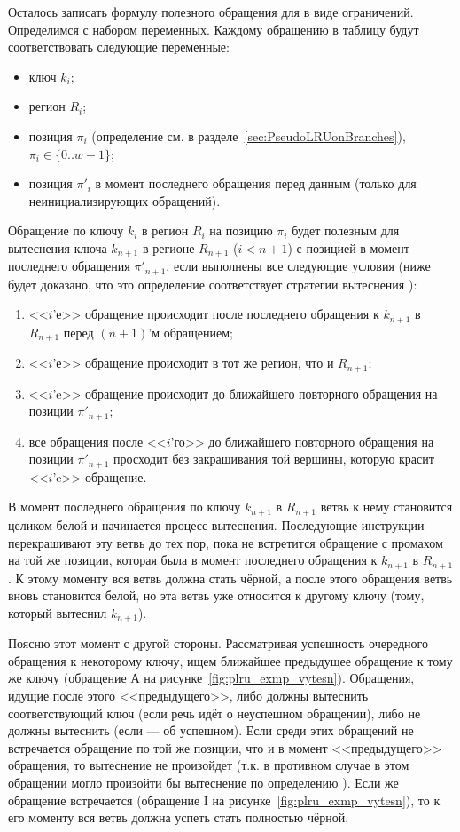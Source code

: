 Осталось записать формулу полезного обращения для \PseudoLRU в виде ограничений. Определимся с набором переменных. Каждому обращению в таблицу будут соответствовать следующие переменные:
\begin{itemize}
  \item ключ $k_i$;
  \item регион $R_i$;
  \item позиция $\pi_i$ (определение см. в разделе~\ref{sec:PseudoLRUonBranches}), $\pi_i \in \{0..w{-}1\}$;
  \item позиция $\pi'_i$ в момент последнего обращения перед данным (только для неинициализирующих обращений).
\end{itemize}

Обращение по ключу $k_i$ в регион $R_i$ на позицию $\pi_i$ будет полезным для вытеснения ключа $k_{n+1}$ в регионе $R_{n+1}$ ($i < n+1$) с позицией в момент последнего обращения $\pi'_{n+1}$, если выполнены все следующие условия (ниже будет доказано, что это определение соответствует стратегии вытеснения \PseudoLRU):
\begin{enumerate}
  \item <<$i$'е>> обращение происходит после последнего обращения к $k_{n+1}$ в $R_{n+1}$ перед $(n+1)$'м обращением;
  \item <<$i$'е>> обращение происходит в тот же регион, что и $R_{n+1}$;
  \item <<$i$'e>> обращение происходит до ближайшего повторного обращения на позиции $\pi'_{n+1}$;
  \item все обращения после <<$i$'го>> до ближайшего повторного обращения на позиции $\pi'_{n+1}$ просходит без закрашивания той вершины, которую красит <<$i$'e>> обращение.
\end{enumerate}

В момент последнего обращения по ключу $k_{n+1}$ в $R_{n+1}$ ветвь к нему становится целиком белой и начинается процесс вытеснения. Последующие инструкции перекрашивают эту ветвь до тех пор, пока не встретится обращение с промахом на той же позиции, которая была в момент последнего обращения к $k_{n+1}$ в $R_{n+1}$. К этому моменту вся ветвь должна стать чёрной, а после этого обращения ветвь вновь становится белой, но эта ветвь уже относится к другому ключу (тому, который вытеснил $k_{n+1}$).

Поясню этот момент с другой стороны. Рассматривая успешность очередного обращения к некоторому ключу, ищем ближайшее предыдущее обращение к тому же ключу (обращение А на рисунке~\ref{fig:plru_exmp_vytesn}). Обращения, идущие после этого <<предыдущего>>, либо должны вытеснить соответствующий ключ (если речь идёт о неуспешном обращении), либо не должны вытеснить (если --- об успешном). Если среди этих обращений не встречается обращение по той же позиции, что и в момент <<предыдущего>> обращения, то вытеснение не произойдет (т.к. в противном случае в этом обращении могло произойти бы вытеснение по определению \PseudoLRU). Если же обращение встречается (обращение I на рисунке~\ref{fig:plru_exmp_vytesn}), то к его моменту вся ветвь должна успеть стать полностью чёрной.

